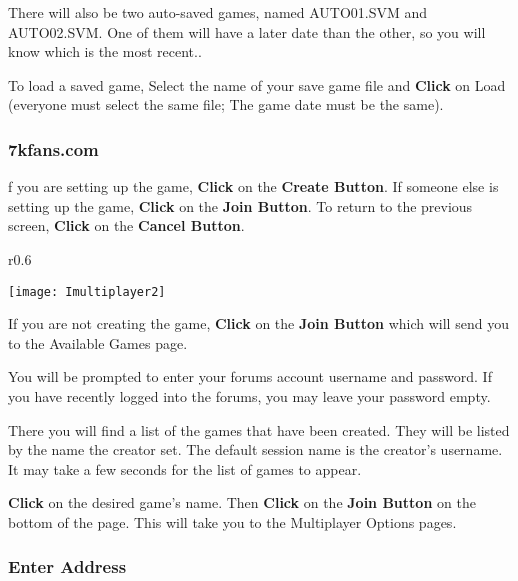 There will also be two auto-saved games, named AUTO01.SVM and AUTO02.SVM. One of them will have a later date than the other, so you will know which is the most recent..

To load a saved game, Select the name of your save game file and \textbf{Click} on Load (everyone must select the same file; The game date must be the same).

\subsubsection{7kfans.com} %


f you are setting up the game, \textbf{Click} on the \textbf{Create Button}. If someone else is setting up the game, \textbf{Click} on the \textbf{Join Button}. To return to the previous screen, \textbf{Click} on the \textbf{Cancel Button}.

\begin{wrapfigure}{r}{0.6\textwidth}
    \begin{center}
        \vspace{-20pt}
        \texttt{[image: Imultiplayer2]} %
    \end{center}
    \vspace{-20pt}
\end{wrapfigure}

If you are not creating the game, \textbf{Click} on the \textbf{Join Button} which will send you to the Available Games page.

You will be prompted to enter your forums account username and password. If you have recently logged into the forums, you may leave your password empty.

There you will find a list of the games that have been created. They will be listed by the name the creator set. The default session name is the creator’s username. It may take a few seconds for the list of games to appear.

\textbf{Click} on the desired game’s name. Then \textbf{Click} on the \textbf{Join Button} on the bottom of the page. This will take you to the Multiplayer Options pages.

\subsubsection{Enter Address}

